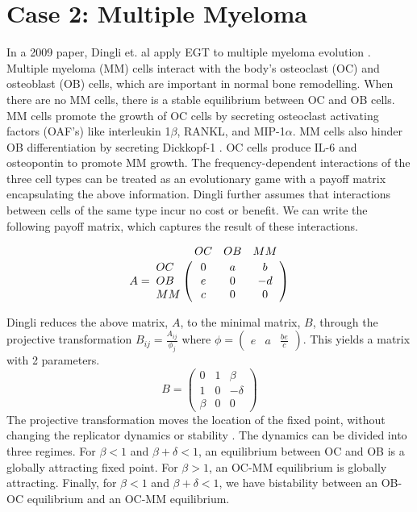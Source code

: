 \documentclass[12pt]{report}
\begin{document}
\section*{Case 2: Multiple Myeloma}
In a 2009 paper, Dingli et. al apply EGT to multiple myeloma evolution \cite{Dingli2009}. Multiple myeloma (MM) cells interact with the body's osteoclast (OC) and osteoblast (OB) cells, which are important in normal bone remodelling. When there are no MM cells, there is a stable equilibrium between OC and OB cells. MM cells promote the growth of OC cells by secreting osteoclast activating factors (OAF's) like interleukin  1$\beta$, RANKL, and MIP-1$\alpha$. MM cells also hinder OB differentiation by secreting Dickkopf-1 \cite{Dingli2009}. OC cells produce IL-6 and osteopontin to promote MM growth. The frequency-dependent interactions of the three cell types can be treated as an evolutionary game with a payoff matrix encapsulating the above information. Dingli further assumes that interactions between cells of the same type incur no cost or benefit. We can write the following payoff matrix, which captures the result of these interactions. 

$$A = \bordermatrix{\text{}&OC&OB&MM\cr
                OC& 0 & a& b \cr
                OB& e  &  0 & -d \cr
                MM& c & 0 & 0 \cr
               }$$

Dingli reduces the above matrix, $A$, to the minimal matrix, $B$, through the projective transformation $B_{ij} = \frac{A_{ij}}{\phi_j}$ where 
$\phi = {\begin{pmatrix} e & a & \frac{be}{c} \end{pmatrix}}$.
This yields a matrix with 2 parameters.
$$B = {\begin{pmatrix}
0 & 1 & \beta \\
1 & 0 & -\delta \\
\beta & 0 & 0
\end{pmatrix}}$$
The projective transformation moves the location of the fixed point, without changing the replicator dynamics or stability \cite{Hofbauer1998}. The dynamics can be divided into three regimes. For $\beta < 1$ and $\beta + \delta < 1$, an equilibrium between OC and OB is a globally attracting fixed point. For $\beta > 1$, an OC-MM equilibrium is globally attracting. Finally, for $\beta < 1$ and $\beta + \delta < 1$, we have bistability between an OB-OC equilibrium and an OC-MM equilibrium. 
\end{document}
